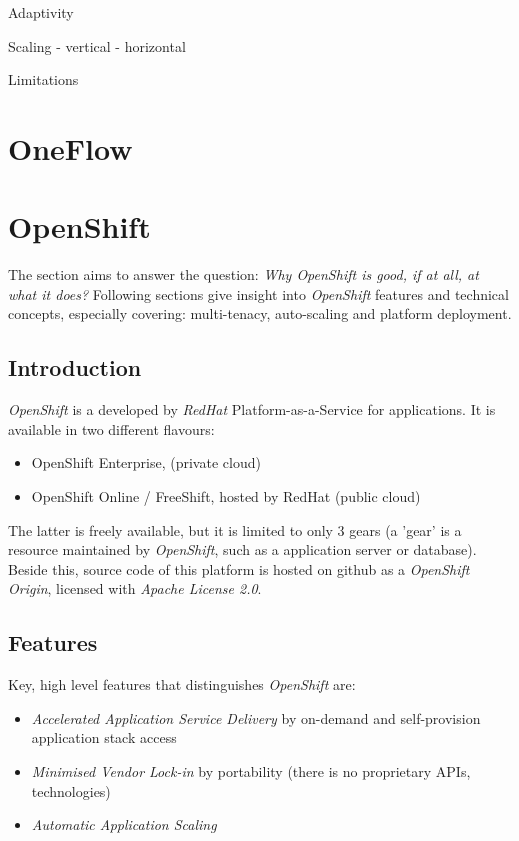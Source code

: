 Adaptivity

Scaling
- vertical
- horizontal

Limitations

\section{OneFlow}

\section{OpenShift}
The section aims to answer the question: \emph{Why OpenShift is good, if at all, at what it does?} Following sections give insight into \emph{OpenShift} \cite{OpenShift} features and technical concepts, especially covering: multi-tenacy, auto-scaling and platform deployment.

\subsection{Introduction}
\emph{OpenShift} is a developed by \emph{RedHat} Platform-as-a-Service for applications. It is available in two different flavours:
\begin{itemize}
 \item OpenShift Enterprise, (private cloud)
 \item OpenShift Online / FreeShift, hosted by RedHat (public cloud)
\end{itemize}

The latter is freely available, but it is limited to only 3 gears (a 'gear' is a resource maintained by \emph{OpenShift}, such as a application server or database). Beside this, source code of this platform is hosted on github as a \emph{OpenShift Origin}, licensed with \emph{Apache License 2.0}.

\subsection{Features}
Key, high level features that distinguishes \emph{OpenShift} are:
\begin{itemize}
  \item \emph{Accelerated Application Service Delivery} by on-demand and self-provision application stack access
  \item \emph{Minimised Vendor Lock-in} by portability (there is no proprietary APIs, technologies)
  \item \emph{Automatic Application Scaling}
\end{itemize}

